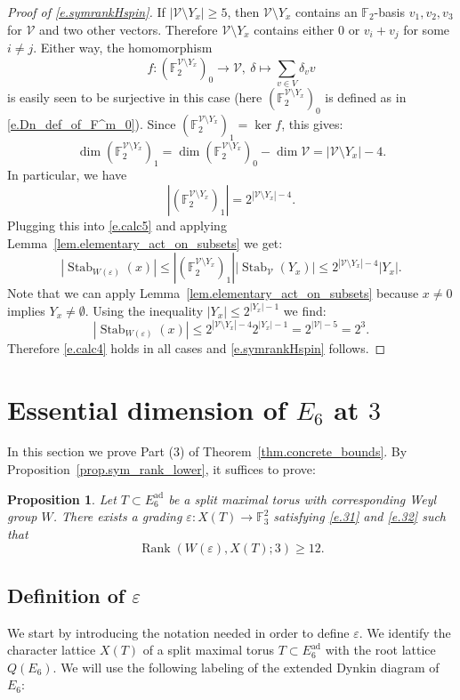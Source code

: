 \documentclass[12pt]{amsart}
\numberwithin{equation}{section}
\newtheorem{proposition}[theorem]{Proposition}
\theoremstyle{definition}
\newcommand{\cV}{\mathcal{V}}
\newcommand{\bF}{\mathbb{F}}
\newcommand{\ad}{\mathrm{ad}}
\newcommand{\SymRank}{\operatorname{Rank}}
\newcommand{\Stab}{\operatorname{Stab}}
\newcommand{\eps}{\varepsilon}
\begin{document}
\begin{proof}[Proof of \eqref{e.symrankHspin}]
        \smallskip
        If $|\cV\setminus Y_x| \geq 5$, then $\cV\setminus Y_x$ contains an $\bF_2$-basis $v_1,v_2,v_3$ for $\cV$ and two other vectors. Therefore $\cV\setminus Y_x$ contains either $0$ or $v_i + v_j$ for some $i\neq j$. Either way, the homomorphism
        $$f: (\bF_2^{\cV\setminus Y_x})_0 \to \cV, \ \delta \mapsto \sum_{v\in V} \delta_v v$$
        is easily seen to be surjective in this case (here $(\bF_2^{\cV\setminus Y_x})_0$ is defined as in \eqref{e.Dn_def_of_F^m_0}). Since $(\bF_2^{\cV\setminus Y_x})_1= \ker f$, this gives:
        $$\dim (\bF_2^{\cV\setminus Y_x})_1  = \dim (\bF_2^{\cV\setminus Y_x})_0 - \dim \cV = |\cV\setminus Y_x|-4.$$
        In particular, we have
        $$|(\bF_2^{\cV\setminus Y_x})_1 | = 2^{ |\cV\setminus Y_x|-4}.$$
        Plugging this into \eqref{e.calc5} and applying Lemma~\ref{lem.elementary_act_on_subsets} we get:
        $$|\Stab_{W(\eps)}(x) | \leq |(\bF_2^{\cV\setminus Y_x})_1 ||\Stab_{\cV}(Y_x)| \leq 2^{|\cV\setminus Y_x| - 4} |Y_x|.$$
        Note that we can apply Lemma~\ref{lem.elementary_act_on_subsets} because $x\neq 0$ implies $Y_x\neq \emptyset$. Using the inequality $|Y_x| \leq 2^{|Y_x| -1}$ we find:
        $$|\Stab_{W(\eps)}(x) | \leq 2^{|\cV\setminus Y_x| - 4} 2^{|Y_x| -1}= 2^{|\cV| -5} = 2^3.$$
        Therefore \eqref{e.calc4} holds in all cases and \eqref{e.symrankHspin} follows.
\end{proof}

\section{Essential dimension of \texorpdfstring{$E_{6}$ at $3$}{E6}}

 In this section we prove Part (3) of Theorem~\ref{thm.concrete_bounds}.  By Proposition~\ref{prop.sym_rank_lower}, it suffices to prove:
\begin{proposition}\label{prop.rank_E6}
Let $T\subset E_6^{\ad}$ be a split maximal torus with corresponding Weyl group $W$. There exists a grading $\eps:X(T) \to \bF_3^2$ satisfying \eqref{e.31} and \eqref{e.32} such that
    \begin{equation}\label{e.symrankE6}
    \SymRank(W(\eps),X(T);3) \geq 12.
\end{equation}
\end{proposition}
\subsection*{Definition of \texorpdfstring{$\eps$}{epsilon}}
We start by introducing the notation needed in order to define $\eps$.
We identify the character lattice $X(T)$ of a split maximal torus $T\subset E_6^{\ad}$ with the root lattice $Q(E_6)$. We will use the following labeling of the extended Dynkin diagram of $E_6$:
\end{document}
